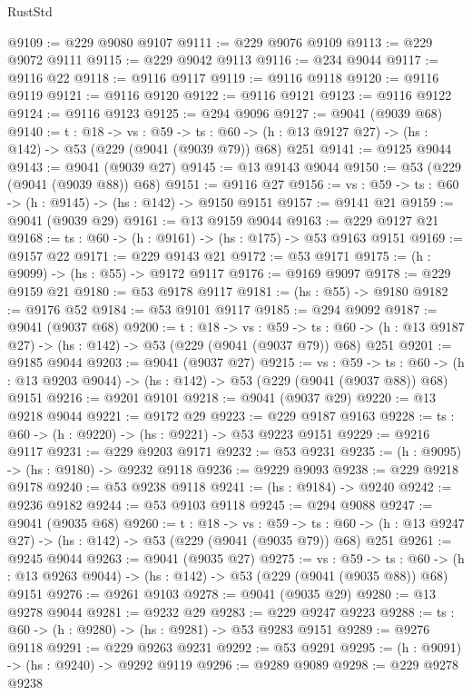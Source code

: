 \begin{lexlean}{RustStd}
\begin{coremodule}
@9109 := @229 @9080 @9107
@9111 := @229 @9076 @9109
@9113 := @229 @9072 @9111
@9115 := @229 @9042 @9113
@9116 := @234 @9044
@9117 := @9116 @22
@9118 := @9116 @9117
@9119 := @9116 @9118
@9120 := @9116 @9119
@9121 := @9116 @9120
@9122 := @9116 @9121
@9123 := @9116 @9122
@9124 := @9116 @9123
@9125 := @294 @9096
@9127 := @9041 (@9039 @68)
@9140 := {t : @18} ->
  {vs : @59} ->
  {ts : @60} -> (h : @13 @9127 @27) -> (hs : @142) -> @53 (@229 (@9041 (@9039 @79)) @68) @251
@9141 := @9125 @9044
@9143 := @9041 (@9039 @27)
@9145 := @13 @9143 @9044
@9150 := @53 (@229 (@9041 (@9039 @88)) @68)
@9151 := @9116 @27
@9156 := {vs : @59} -> {ts : @60} -> (h : @9145) -> (hs : @142) -> @9150 @9151
@9157 := @9141 @21
@9159 := @9041 (@9039 @29)
@9161 := @13 @9159 @9044
@9163 := @229 @9127 @21
@9168 := {ts : @60} -> (h : @9161) -> (hs : @175) -> @53 @9163 @9151
@9169 := @9157 @22
@9171 := @229 @9143 @21
@9172 := @53 @9171
@9175 := (h : @9099) -> (hs : @55) -> @9172 @9117
@9176 := @9169 @9097
@9178 := @229 @9159 @21
@9180 := @53 @9178 @9117
@9181 := (hs : @55) -> @9180
@9182 := @9176 @52
@9184 := @53 @9101 @9117
@9185 := @294 @9092
@9187 := @9041 (@9037 @68)
@9200 := {t : @18} ->
  {vs : @59} ->
  {ts : @60} -> (h : @13 @9187 @27) -> (hs : @142) -> @53 (@229 (@9041 (@9037 @79)) @68) @251
@9201 := @9185 @9044
@9203 := @9041 (@9037 @27)
@9215 := {vs : @59} ->
  {ts : @60} -> (h : @13 @9203 @9044) -> (hs : @142) -> @53 (@229 (@9041 (@9037 @88)) @68) @9151
@9216 := @9201 @9101
@9218 := @9041 (@9037 @29)
@9220 := @13 @9218 @9044
@9221 := @9172 @29
@9223 := @229 @9187 @9163
@9228 := {ts : @60} -> (h : @9220) -> (hs : @9221) -> @53 @9223 @9151
@9229 := @9216 @9117
@9231 := @229 @9203 @9171
@9232 := @53 @9231
@9235 := (h : @9095) -> (hs : @9180) -> @9232 @9118
@9236 := @9229 @9093
@9238 := @229 @9218 @9178
@9240 := @53 @9238 @9118
@9241 := (hs : @9184) -> @9240
@9242 := @9236 @9182
@9244 := @53 @9103 @9118
@9245 := @294 @9088
@9247 := @9041 (@9035 @68)
@9260 := {t : @18} ->
  {vs : @59} ->
  {ts : @60} -> (h : @13 @9247 @27) -> (hs : @142) -> @53 (@229 (@9041 (@9035 @79)) @68) @251
@9261 := @9245 @9044
@9263 := @9041 (@9035 @27)
@9275 := {vs : @59} ->
  {ts : @60} -> (h : @13 @9263 @9044) -> (hs : @142) -> @53 (@229 (@9041 (@9035 @88)) @68) @9151
@9276 := @9261 @9103
@9278 := @9041 (@9035 @29)
@9280 := @13 @9278 @9044
@9281 := @9232 @29
@9283 := @229 @9247 @9223
@9288 := {ts : @60} -> (h : @9280) -> (hs : @9281) -> @53 @9283 @9151
@9289 := @9276 @9118
@9291 := @229 @9263 @9231
@9292 := @53 @9291
@9295 := (h : @9091) -> (hs : @9240) -> @9292 @9119
@9296 := @9289 @9089
@9298 := @229 @9278 @9238

\end{coremodule}
\end{lexlean}
